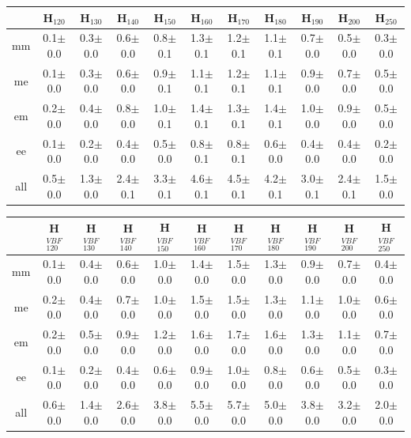 \begin{table}[!ht]
\begin{center}
{\begin{tabular} {|c|c|c|c|c|c|c|c|c|c|c|}
 \hline
  \end{tabular}
  }
 {\small
  \begin{tabular} {|c|c|c|c|c|c|c|c|c|c|c|}
  \hline
     &   H$_{120}$ &  H$_{130}$ &    H$_{140}$ &   H$_{150}$ &   H$_{160}$ &   H$_{170}$ &   H$_{180}$ &   H$_{190}$ &   H$_{200}$ &   H$_{250}$ \\
  \hline
  \hline
  mm &  0.1$\pm$0.0 &  0.3$\pm$0.0 &  0.6$\pm$0.0 &  0.8$\pm$0.1 &  1.3$\pm$0.1 &  1.2$\pm$0.1 &  1.1$\pm$0.1 &  0.7$\pm$0.0 &  0.5$\pm$0.0 &  0.3$\pm$0.0 \\
  me &  0.1$\pm$0.0 &  0.3$\pm$0.0 &  0.6$\pm$0.0 &  0.9$\pm$0.1 &  1.1$\pm$0.1 &  1.2$\pm$0.1 &  1.1$\pm$0.1 &  0.9$\pm$0.0 &  0.7$\pm$0.0 &  0.5$\pm$0.0 \\
  em &  0.2$\pm$0.0 &  0.4$\pm$0.0 &  0.8$\pm$0.0 &  1.0$\pm$0.1 &  1.4$\pm$0.1 &  1.3$\pm$0.1 &  1.4$\pm$0.1 &  1.0$\pm$0.0 &  0.9$\pm$0.0 &  0.5$\pm$0.0 \\
  ee &  0.1$\pm$0.0 &  0.2$\pm$0.0 &  0.4$\pm$0.0 &  0.5$\pm$0.0 &  0.8$\pm$0.1 &  0.8$\pm$0.1 &  0.6$\pm$0.0 &  0.4$\pm$0.0 &  0.4$\pm$0.0 &  0.2$\pm$0.0 \\
  \hline
 all &  0.5$\pm$0.0 &  1.3$\pm$0.0 &  2.4$\pm$0.1 &  3.3$\pm$0.1 &  4.6$\pm$0.1 &  4.5$\pm$0.1 &  4.2$\pm$0.1 &  3.0$\pm$0.1 &  2.4$\pm$0.1 &  1.5$\pm$0.0 \\
 \hline
  \end{tabular}
  }
 {\small
  \begin{tabular} {|c|c|c|c|c|c|c|c|c|c|c|}
  \hline
     &   H$^{VBF}_{120}$ &  H$^{VBF}_{130}$ &    H$^{VBF}_{140}$ &   H$^{VBF}_{150}$ &   H$^{VBF}_{160}$ &   H$^{VBF}_{170}$ &   H$^{VBF}_{180}$ &   H$^{VBF}_{190}$ &   H$^{VBF}_{200}$ &   H$^{VBF}_{250}$ \\
  \hline
  \hline
  mm &  0.1$\pm$0.0 &  0.4$\pm$0.0 &  0.6$\pm$0.0 &  1.0$\pm$0.0 &  1.4$\pm$0.0 &  1.5$\pm$0.0 &  1.3$\pm$0.0 &  0.9$\pm$0.0 &  0.7$\pm$0.0 &  0.4$\pm$0.0 \\
  me &  0.2$\pm$0.0 &  0.4$\pm$0.0 &  0.7$\pm$0.0 &  1.0$\pm$0.0 &  1.5$\pm$0.0 &  1.5$\pm$0.0 &  1.3$\pm$0.0 &  1.1$\pm$0.0 &  1.0$\pm$0.0 &  0.6$\pm$0.0 \\
  em &  0.2$\pm$0.0 &  0.5$\pm$0.0 &  0.9$\pm$0.0 &  1.2$\pm$0.0 &  1.6$\pm$0.0 &  1.7$\pm$0.0 &  1.6$\pm$0.0 &  1.3$\pm$0.0 &  1.1$\pm$0.0 &  0.7$\pm$0.0 \\
  ee &  0.1$\pm$0.0 &  0.2$\pm$0.0 &  0.4$\pm$0.0 &  0.6$\pm$0.0 &  0.9$\pm$0.0 &  1.0$\pm$0.0 &  0.8$\pm$0.0 &  0.6$\pm$0.0 &  0.5$\pm$0.0 &  0.3$\pm$0.0 \\
  \hline
 all &  0.6$\pm$0.0 &  1.4$\pm$0.0 &  2.6$\pm$0.0 &  3.8$\pm$0.0 &  5.5$\pm$0.0 &  5.7$\pm$0.0 &  5.0$\pm$0.0 &  3.8$\pm$0.0 &  3.2$\pm$0.0 &  2.0$\pm$0.0 \\


\end{tabular}}
\end{center}
\end{table}
